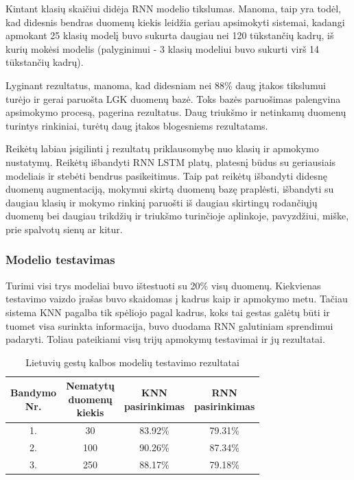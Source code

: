 \documentclass{VUMIFPSbakalaurinis}
\begin{document}
Kintant klasių skaičiui didėja RNN modelio tikslumas. Manoma, taip yra todėl, kad didesnis bendras duomenų kiekis leidžia geriau apsimokyti sistemai, kadangi apmokant 25 klasių modelį buvo sukurta daugiau nei 120 tūkstančių kadrų, iš kurių mokėsi modelis (palyginimui - 3 klasių modeliui buvo sukurti virš 14 tūkstančių kadrų). 

Lyginant rezultatus, manoma, kad didesniam nei 88\% daug įtakos tikslumui turėjo ir gerai paruošta LGK duomenų bazė. Toks bazės paruošimas palengvina apsimokymo procesą, pagerina rezultatus. Daug triukšmo ir netinkamų duomenų turintys rinkiniai, turėtų daug įtakos blogesniems rezultatams.

Reikėtų labiau įsigilinti į rezultatų priklausomybę nuo klasių ir apmokymo nustatymų. Reikėtų išbandyti RNN LSTM platų, platesnį būdus su geriausiais modeliais ir stebėti bendrus pasikeitimus. Taip pat reikėtų išbandyti didesnę duomenų augmentaciją, mokymui skirtą duomenų bazę praplėsti, išbandyti su daugiau klasių ir mokymo rinkinį paruošti iš daugiau skirtingų rodančiųjų duomenų bei daugiau trikdžių ir triukšmo turinčioje aplinkoje, pavyzdžiui, miške, prie spalvotų sienų ar kitur.

\subsubsection{Modelio testavimas}

Turimi visi trys modeliai buvo ištestuoti su 20\% visų duomenų. Kiekvienas testavimo vaizdo įrašas buvo skaidomas į kadrus kaip ir apmokymo metu. Tačiau sistema KNN pagalba tik spėliojo pagal kadrus, koks tai gestas galėtų būti ir tuomet visa surinkta informacija, buvo duodama RNN galutiniam sprendimui padaryti. Toliau pateikiami visų trijų apmokymų testavimai ir jų rezultatai.

\begin{table}[H]\footnotesize
	\centering
	\caption{Lietuvių gestų kalbos modelių testavimo rezultatai}
	{\begin{tabular}{| c | c | c | c |}
		\hline
		\thead{Bandymo\\Nr.} & \thead{Nematytų\\duomenų\\kiekis} & \thead{KNN\\pasirinkimas}  & \thead{RNN\\pasirinkimas}  \\
		\hline
		1. & 30 & 83.92\% & 79.31\% \\
		\hline
		2. & 100  & 90.26\% & 87.34\% \\
		\hline
		3. & 250 & 88.17\% & 79.18\% \\
		\hline
	\end{tabular}}
	\label{tab:lgk-testavimas}
\end{table}
\end{document}
